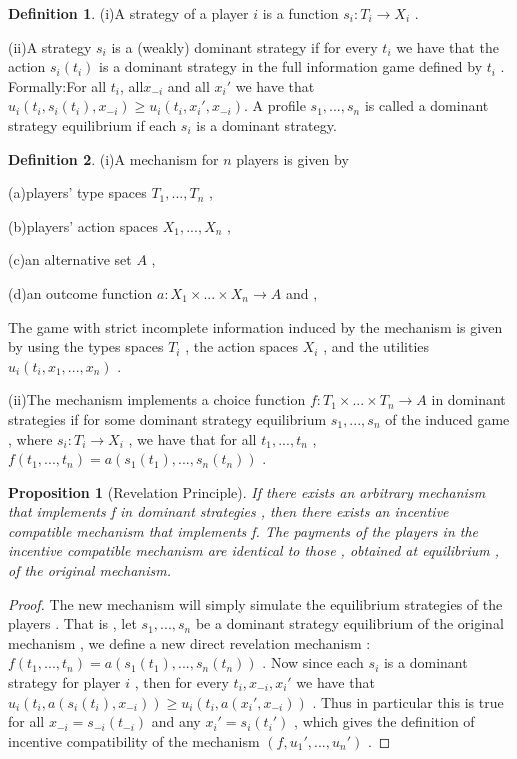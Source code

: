 \documentclass[10pt,reqno]{amsart}
\newtheorem{pro}{Proposition}[section]
\theoremstyle{definition}
\newtheorem{defn}{Definition}[section]
\theoremstyle{remark}
\numberwithin{equation}{section}
\begin{document}
\begin{defn}
(i)A strategy of a player $i$ is a function $s_i:T_i\rightarrow X_i$ .

(ii)A strategy $s_i$ is a (weakly) dominant strategy if for every $t_i$ we have that the action $s_i(t_i)$ is a dominant strategy in the full information game defined by $t_i$ . Formally:For all $t_i$, all$x_{-i}$ and all $x_i'$ we have that $u_i(t_i,s_i(t_i),x_{-i})\ge u_i(t_i,x_i',x_{-i})$. A profile $s_1,...,s_n$ is called a dominant strategy equilibrium if each $s_i$ is a dominant strategy.
\end{defn}

\begin{defn}
(i)A mechanism for $n$ players is given by

(a)players' type spaces $T_1,...,T_n$ ,

(b)players' action spaces $X_1,...,X_n$ ,

(c)an alternative set $A$ ,

(d)an outcome function $a:X_1\times...\times X_n\rightarrow A$ and ,


The game with strict incomplete information induced by the mechanism is given by using the types spaces $T_i$ , the action spaces $X_i$ , and the utilities $u_i(t_i,x_1,...,x_n)$ .

(ii)The mechanism implements a choice function $f:T_1\times...\times T_n\rightarrow A$ in dominant strategies if for some dominant strategy equilibrium $s_1,...,s_n$ of the induced game , where $s_i:T_i\rightarrow X_i$ , we have that for all $t_1,...,t_n$ , $f(t_1,...,t_n)=a(s_1(t_1),...,s_n(t_n))$ .

\end{defn}

\begin{pro}[Revelation Principle]
If there exists an arbitrary mechanism that implements f in dominant strategies , then there exists an incentive compatible mechanism that implements f. The payments of the players in the incentive compatible mechanism are identical to those , obtained at equilibrium , of the original mechanism.
\end{pro}

\begin{proof}
The new mechanism will simply simulate the equilibrium strategies of the players . That is , let $s_1,...,s_n$ be a dominant strategy equilibrium of the original mechanism , we define a new direct revelation mechanism : $f(t_1,...,t_n)=a(s_1(t_1),...,s_n(t_n))$ . Now since each $s_i$ is a dominant strategy for player $i$ , then for every $t_i,x_{-i},x_i'$ we have that $u_i(t_i,a(s_i(t_i),x_{-i}))\ge u_i(t_i,a(x_i',x_{-i}))$ . Thus in particular this is true for all $x_{-i}=s_{-i}(t_{-i})$ and any $x_i'=s_i(t_i')$ , which gives the definition of incentive compatibility of the mechanism $(f,u_1',...,u_n')$ .

\end{proof}
\end{document}
